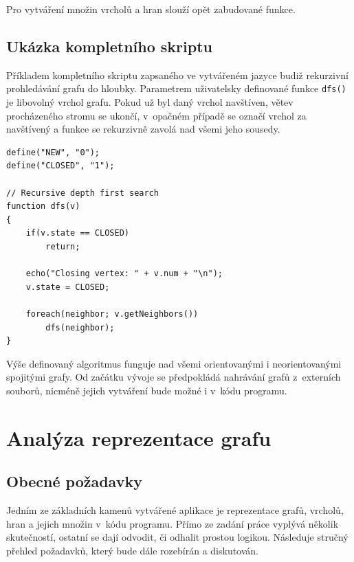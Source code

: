 \documentclass[11pt,twoside,a4paper]{book}
\begin{document}
Pro vytváření množin vrcholů a hran slouží opět zabudované funkce.


\subsection{Ukázka kompletního skriptu}

Příkladem kompletního skriptu zapsaného ve vytvářeném jazyce budiž rekurzivní pro\-hle\-dá\-vá\-ní grafu do hloubky. Parametrem uživatelsky definované funkce \texttt{dfs()} je libovolný vrchol grafu. Pokud už byl daný vrchol navštíven, větev procházeného stromu se ukončí, v~opačném případě se označí vrchol za navštívený a funkce se rekurzivně zavolá nad všemi jeho sousedy.

\begin{verbatim}
define("NEW", "0");
define("CLOSED", "1");

// Recursive depth first search
function dfs(v)
{
    if(v.state == CLOSED)
        return;

    echo("Closing vertex: " + v.num + "\n");
    v.state = CLOSED;

    foreach(neighbor; v.getNeighbors())
        dfs(neighbor);
}
\end{verbatim}


Výše definovaný algoritmus funguje nad všemi orientovanými i neorientovanými spojitými grafy. Od začátku vývoje se předpokládá nahrávání grafů z~externích souborů, nicméně jejich vytváření bude možné i v~kódu programu.


\section{Analýza reprezentace grafu}

\subsection{Obecné požadavky}

Jedním ze základních kamenů vytvářené aplikace je reprezentace grafů, vrcholů, hran a jejich množin v~kódu programu. Přímo ze zadání práce vyplývá několik skutečností, ostatní se dají odvodit, či odhalit prostou logikou. Následuje stručný přehled požadavků, který bude dále rozebírán a diskutován.
\end{document}
